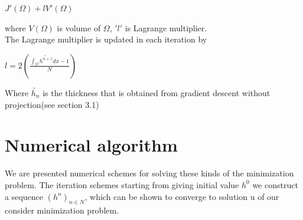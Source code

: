 \documentclass[paper=a4, fontsize=11pt]{scrartcl}
\numberwithin{equation}{section}		%
\numberwithin{figure}{section}			%
\numberwithin{table}{section}				%
\begin{document}
\begin{center}



$J'(\Omega)+ l V'(\Omega)$
\end{center}
where $V(\Omega)$ is volume of $\Omega$, $ 'l' $ is Lagrange multiplier.\\
The Lagrange multiplier is updated in each iteration by 


\begin{center}



$ l = 2(\frac{\int_{\Omega}  \tilde{h^{n+1}}  dx -1 }{N})$
\end{center}
Where $\tilde{h_{n}}$ is the thickness that is obtained from gradient descent without projection(see section 3.1)


\section{Numerical algorithm}
We are presented numerical schemes for solving these kinds of the minimization problem. The iteration schemes starting from giving initial value $h^{0}$ we construct a sequence $(h^{n})_{n \in N}$, which can be shown to converge to solution u of our consider minimization problem.
\end{document}
